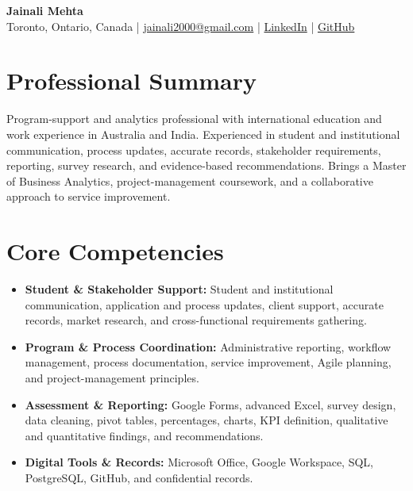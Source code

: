 \documentclass[letterpaper,10pt]{article}
\begin{document}
\begin{center}
  {\fontsize{17}{19}\selectfont\textbf{Jainali Mehta}}\\[2pt]
  \small Toronto, Ontario, Canada \;|\;
  \href{mailto:jainali2000@gmail.com}{jainali2000@gmail.com} \;|\;
  \href{https://www.linkedin.com/in/jainali-mehta}{LinkedIn} \;|\;
  \href{https://github.com/jainalimehta}{GitHub}
\end{center}
\vspace{-7pt}

\section{Professional Summary}
\small Program-support and analytics professional with international education and work experience in Australia and India. Experienced in student and institutional communication, process updates, accurate records, stakeholder requirements, reporting, survey research, and evidence-based recommendations. Brings a Master of Business Analytics, project-management coursework, and a collaborative approach to service improvement.

\section{Core Competencies}
\begin{itemize}[leftmargin=0.16in,label=\textbullet,topsep=0pt,itemsep=1pt,parsep=0pt]
  \item \small \textbf{Student \& Stakeholder Support:} Student and institutional communication, application and process updates, client support, accurate records, market research, and cross-functional requirements gathering.
  \item \small \textbf{Program \& Process Coordination:} Administrative reporting, workflow management, process documentation, service improvement, Agile planning, and project-management principles.
  \item \small \textbf{Assessment \& Reporting:} Google Forms, advanced Excel, survey design, data cleaning, pivot tables, percentages, charts, KPI definition, qualitative and quantitative findings, and recommendations.
  \item \small \textbf{Digital Tools \& Records:} Microsoft Office, Google Workspace, SQL, PostgreSQL, GitHub, and confidential records.
\end{itemize}
\end{document}
